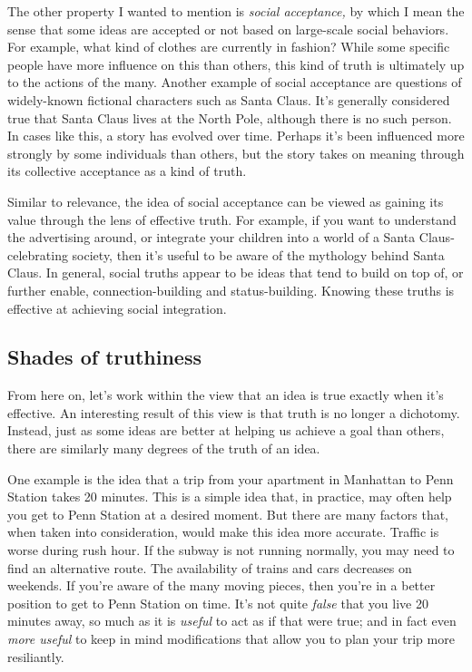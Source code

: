 \documentclass[20pt,]{extarticle}
\begin{document}
The other property I wanted to mention is \emph{social acceptance,} by
which I mean the sense that some ideas are accepted or not based on
large-scale social behaviors. For example, what kind of clothes are
currently in fashion? While some specific people have more influence on
this than others, this kind of truth is ultimately up to the actions of
the many. Another example of social acceptance are questions of
widely-known fictional characters such as Santa Claus. It's generally
considered true that Santa Claus lives at the North Pole, although there
is no such person. In cases like this, a story has evolved over time.
Perhaps it's been influenced more strongly by some individuals than
others, but the story takes on meaning through its collective acceptance
as a kind of truth.

Similar to relevance, the idea of social acceptance can be viewed as
gaining its value through the lens of effective truth. For example, if
you want to understand the advertising around, or integrate your
children into a world of a Santa Claus-celebrating society, then it's
useful to be aware of the mythology behind Santa Claus. In general,
social truths appear to be ideas that tend to build on top of, or
further enable, connection-building and status-building. Knowing these
truths is effective at achieving social integration.

\subsection{Shades of truthiness}\label{shades-of-truthiness}

From here on, let's work within the view that an idea is true exactly
when it's effective. An interesting result of this view is that truth is
no longer a dichotomy. Instead, just as some ideas are better at helping
us achieve a goal than others, there are similarly many degrees of the
truth of an idea.

One example is the idea that a trip from your apartment in Manhattan to
Penn Station takes 20 minutes. This is a simple idea that, in practice,
may often help you get to Penn Station at a desired moment. But there
are many factors that, when taken into consideration, would make this
idea more accurate. Traffic is worse during rush hour. If the subway is
not running normally, you may need to find an alternative route. The
availability of trains and cars decreases on weekends. If you're aware
of the many moving pieces, then you're in a better position to get to
Penn Station on time. It's not quite \emph{false} that you live 20
minutes away, so much as it is \emph{useful} to act as if that were
true; and in fact even \emph{more useful} to keep in mind modifications
that allow you to plan your trip more resiliantly.
\end{document}
